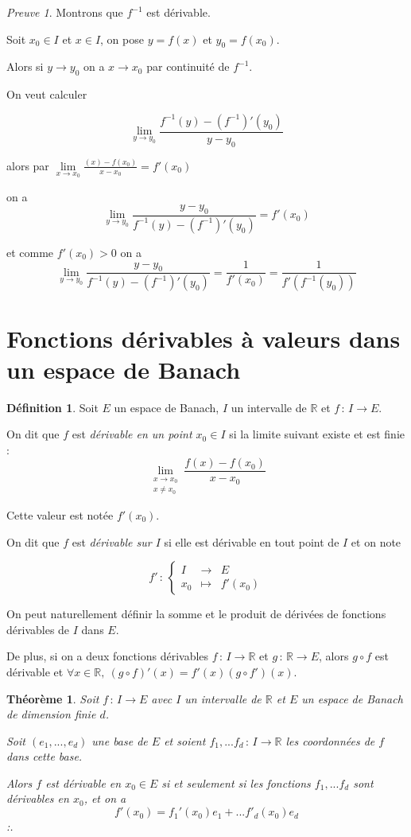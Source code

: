 \documentclass[]{article}
\newtheorem{mythm}{Théorème}
\theoremstyle{remark}
\newtheorem{myproof}{Preuve}
\theoremstyle{definition}
\newtheorem{mydef}{Définition}
\newcommand{\func}[5]{
#1 \, : \, \left\{ \begin{array}{lcl}
	#2 & \longrightarrow & #3 \\
	#4 & \longmapsto & #5
\end{array}
\right.
}
\newcommand{\funcshort}[3]{
#1 \, : \, #2 \longrightarrow #3
}
\begin{document}
\begin{myproof}
	Montrons que $f^{-1}$ est dérivable.
	
	Soit $x_0 \in I$ et $x \in I$, on pose $y=f(x)$ et $y_0=f(x_0)$.
	
	Alors si $y \longrightarrow y_0$ on a $x \longrightarrow x_0$ par continuité de $f^{-1}$.
	
	On veut calculer
	
	$$\lim\limits_{y \to y_0} \frac{f^{-1}(y) - (f^{-1})'(y_0)}{y-y_0}$$
	
	alors par $\lim\limits_{x \to x_0} \frac{(x)-f(x_0)}{x - x_0} = f'(x_0)$
	
	on a $$\lim\limits_{y \to y_0} \frac{y-y_0}{f^{-1}(y) - (f^{-1})'(y_0)} = f'(x_0)$$
		
	et comme $f'(x_0) > 0$ on a $$\lim\limits_{y \to y_0} \frac{y-y_0}{f^{-1}(y) - (f^{-1})'(y_0)} = \frac{1}{f'(x_0)} = \frac{1}{f'(f^{-1}(y_0))}$$ 
\end{myproof}

\section{Fonctions dérivables à valeurs dans un espace de Banach}

\begin{mydef}
	Soit $E$ un espace de Banach, $I$ un intervalle de $\mathbb{R}$ et $\funcshort{f}{I}{E}$.
	
	On dit que $f$ est \textit{dérivable en un point $x_0 \in I$} si la limite suivant existe et est finie :
	$$\lim\limits_{\substack{x \to x_0 \\ x \neq x_0}} \frac{f(x) - f(x_0)}{x - x_0}$$
	
	Cette valeur est notée $f'(x_0)$.
	
	On dit que $f$ est \textit{dérivable sur $I$} si elle est dérivable en tout point de $I$ et on note
	
	$$\func{f'}{I}{E}{x_0}{f'(x_0)}$$
\end{mydef}

On peut naturellement définir la somme et le produit de dérivées de fonctions dérivables de $I$ dans $E$.

De plus, si on a deux fonctions dérivables $\funcshort{f}{I}{\mathbb{R}}$ et $\funcshort{g}{\mathbb{R}}{E}$, alors $g \circ f$ est dérivable et $\forall x \in \mathbb{R}, ~ (g \circ f)'(x) = f'(x)(g \circ f')(x)$.

\begin{mythm}
	Soit $\funcshort{f}{I}{E}$ avec $I$ un intervalle de $\mathbb{R}$ et $E$ un espace de Banach de dimension finie $d$.
	
	Soit $(e_1, ..., e_d)$ une base de $E$ et soient $\funcshort{f_1, ...f_d}{I}{\mathbb{R}}$ les coordonnées de $f$ dans cette base.
	
	Alors $f$ est dérivable en $x_0 \in E$ si et seulement si les fonctions $f_1, ... f_d$  sont dérivables en $x_0$, et on a $$f'(x_0) = f_1'(x_0) e_1 + ... f'_d(x_0) e_d$$ :.
\end{mythm}
\end{document}
